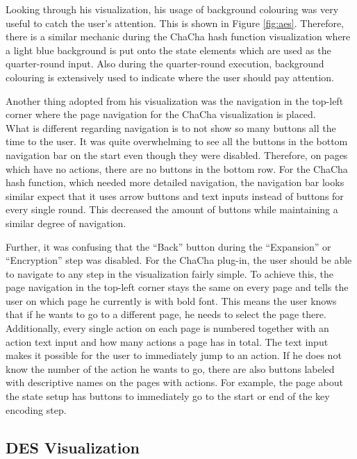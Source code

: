 Looking through his visualization, his usage of background colouring was very useful to catch the user's attention. This is shown in Figure \ref{fig:aes}. Therefore, there is a similar mechanic during the ChaCha hash function visualization where a light blue background is put onto the state elements which are used as the quarter-round input. Also during the quarter-round execution, background colouring is extensively used to indicate where the user should pay attention.

Another thing adopted from his visualization was the navigation in the top-left corner where the page navigation for the ChaCha visualization is placed. \\
What is different regarding navigation is to not show so many buttons all the time to the user. It was quite overwhelming to see all the buttons in the bottom navigation bar on the start even though they were disabled. Therefore, on pages which have no actions, there are no buttons in the bottom row. For the ChaCha hash function, which needed more detailed navigation, the navigation bar looks similar expect that it uses arrow buttons and text inputs instead of buttons for every single round. This decreased the amount of buttons while maintaining a similar degree of navigation.

Further, it was confusing that the ``Back'' button during the ``Expansion'' or ``Encryption'' step was disabled. For the ChaCha plug-in, the user should be able to navigate to any step in the visualization fairly simple. To achieve this, the page navigation in the top-left corner stays the same on every page and tells the user on which page he currently is with bold font. This means the user knows that if he wants to go to a different page, he needs to select the page there. Additionally, every single action on each page is numbered together with an action text input and how many actions a page has in total. The text input makes it possible for the user to immediately jump to an action. If he does not know the number of the action he wants to go, there are also buttons labeled with descriptive names on the pages with actions. For example, the page about the state setup has buttons to immediately go to the start or end of the key encoding step.

\subsection{DES Visualization}
\label{sec:desVisualization}

